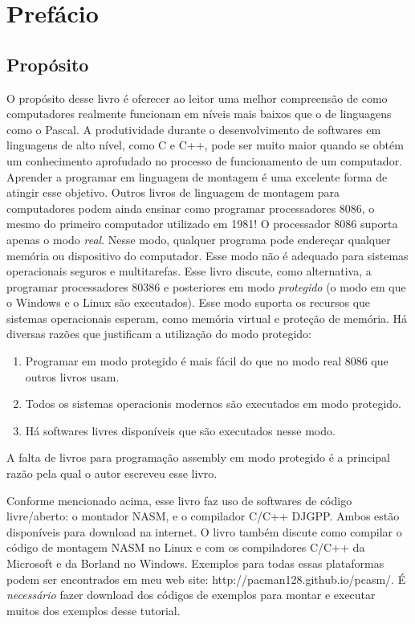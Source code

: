 
\chapter{Pref\'acio}

\section*{Prop\'osito}

O prop\'osito desse livro \'e oferecer ao leitor uma melhor compreens\~ao
de como computadores realmente funcionam em n\'iveis mais baixos que o de 
linguagens como o Pascal. A produtividade durante o desenvolvimento de
softwares em linguagens de alto n\'ivel, como C e C++, pode ser muito maior
quando se obt\'em um conhecimento aprofudado no processo de funcionamento de um
computador. Aprender a programar em linguagem de montagem \'e uma excelente forma
de atingir esse objetivo. Outros livros de linguagem de montagem para 
computadores podem ainda ensinar como programar processadores 8086, o mesmo
do primeiro computador utilizado em 1981! O processador 8086 suporta apenas o modo
\emph{real}. Nesse modo, qualquer programa pode endere\c{c}ar qualquer mem\'oria ou
dispositivo do computador. Esse modo n\~ao \'e adequado para sistemas operacionais
seguros e multitarefas. Esse livro discute, como alternativa, a programar 
processadores 80386 e posteriores em modo \emph{protegido} (o modo em que o 
Windows e o Linux s\~ao executados). Esse modo suporta os recursos que sistemas 
operacionais esperam, como mem\'oria virtual e prote\c{c}\~ao de mem\'oria.
H\'a diversas raz\~oes que justificam a utiliza\c{c}\~ao do modo protegido:

\begin{enumerate}
\item Programar em modo protegido \'e mais f\'acil do que no modo real 8086
	  que outros livros usam.
\item Todos os sistemas operacionis modernos s\~ao executados em modo protegido.
\item H\'a softwares livres dispon\'iveis que s\~ao executados nesse modo.
\end{enumerate}
A falta de livros para programa\c{c}\~ao assembly em modo protegido \'e a principal
raz\~ao pela qual o autor escreveu esse livro.

Conforme mencionado acima, esse livro faz uso de softwares de
c\'odigo livre/aberto: o montador NASM, e o compilador
C/C++ DJGPP. Ambos est\~ao dispon\'iveis para download na internet. O livro
tamb\'em discute como compilar o c\'odigo de montagem NASM no Linux e com os
compiladores C/C++ da Microsoft e da Borland no Windows. Exemplos para todas
essas plataformas podem ser encontrados em meu web site:
{\code http://pacman128.github.io/pcasm/}.
\'E \emph{necess\'ario} fazer download dos c\'odigos de exemplos para montar e
executar muitos dos exemplos desse tutorial.

